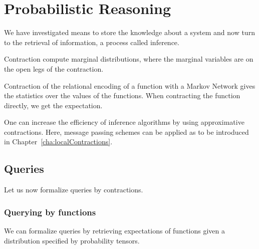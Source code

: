 \section{Probabilistic Reasoning}\label{cha:probReasoning} 

We have investigated means to store the knowledge about a system and now turn to the retrieval of information, a process called inference.


\begin{remark}
	Contraction compute marginal distributions, where the marginal variables are on the open legs of the contraction.
\end{remark}

% 
Contraction of the relational encoding of a function with a Markov Network gives the statistics over the values of the functions.
When contracting the function directly, we get the expectation.

One can increase the efficiency of inference algorithms by using approximative contractions.
Here, message passing schemes can be applied as to be introduced in Chapter~\ref{cha:localContractions}.

\subsection{Queries}

Let us now formalize queries by contractions.

\subsubsection{Querying by functions}

We can formalize queries by retrieving expectations of functions given a distribution specified by probability tensors. 

